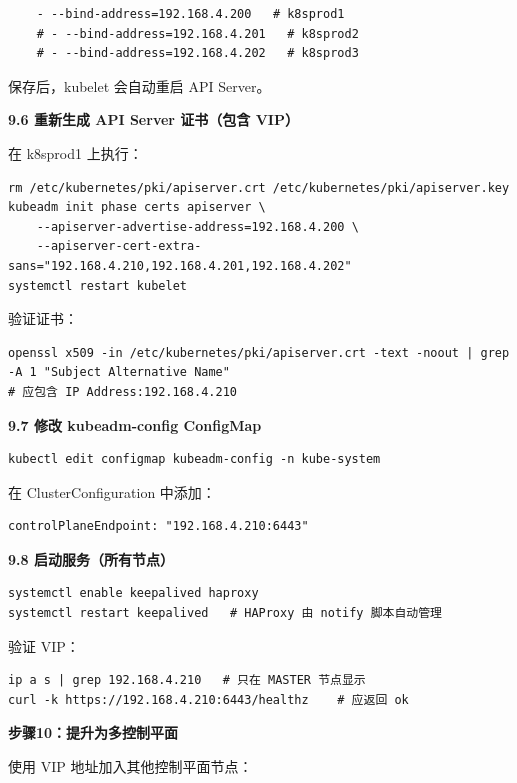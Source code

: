 \documentclass[12pt,UTF8]{ctexbook}
\begin{document}
\begin{lstlisting}
    - --bind-address=192.168.4.200   # k8sprod1
    # - --bind-address=192.168.4.201   # k8sprod2
    # - --bind-address=192.168.4.202   # k8sprod3
\end{lstlisting}

保存后，kubelet 会自动重启 API Server。

\textbf{9.6 重新生成 API Server 证书（包含 VIP）}

在 k8sprod1 上执行：

\begin{lstlisting}
rm /etc/kubernetes/pki/apiserver.crt /etc/kubernetes/pki/apiserver.key
kubeadm init phase certs apiserver \
    --apiserver-advertise-address=192.168.4.200 \
    --apiserver-cert-extra-sans="192.168.4.210,192.168.4.201,192.168.4.202"
systemctl restart kubelet
\end{lstlisting}

验证证书：

\begin{lstlisting}
openssl x509 -in /etc/kubernetes/pki/apiserver.crt -text -noout | grep -A 1 "Subject Alternative Name"
# 应包含 IP Address:192.168.4.210
\end{lstlisting}

\textbf{9.7 修改 kubeadm-config ConfigMap}

\begin{lstlisting}
kubectl edit configmap kubeadm-config -n kube-system
\end{lstlisting}

在 ClusterConfiguration 中添加：

\begin{lstlisting}
controlPlaneEndpoint: "192.168.4.210:6443"
\end{lstlisting}

\textbf{9.8 启动服务（所有节点）}

\begin{lstlisting}
systemctl enable keepalived haproxy
systemctl restart keepalived   # HAProxy 由 notify 脚本自动管理
\end{lstlisting}

验证 VIP：

\begin{lstlisting}
ip a s | grep 192.168.4.210   # 只在 MASTER 节点显示
curl -k https://192.168.4.210:6443/healthz    # 应返回 ok
\end{lstlisting}

\textbf{步骤10：提升为多控制平面}

使用 VIP 地址加入其他控制平面节点：
\end{document}
